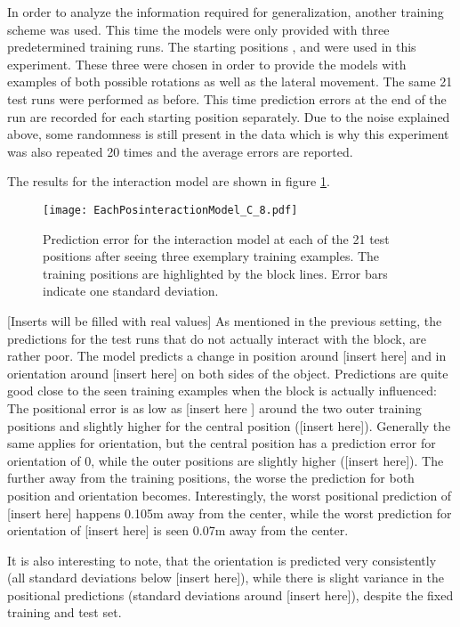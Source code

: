 In order to analyze the information required for generalization, another training scheme was used. This time the models were only provided with three predetermined training runs. The starting positions ,  and  were used in this experiment. These three were chosen in order to provide the models with examples of both possible rotations as well as the lateral movement. The same 21 test runs were performed as before. This time prediction errors at the end of the run are recorded for each starting position separately. Due to the noise explained above, some randomness is still present in the data which is why this experiment was also repeated 20 times and the average errors are reported. 

The results for the interaction model are shown in figure \ref{fig:eachPosInteraction}.

\begin{figure}
\centering
\texttt{[image: EachPosinteractionModel\_C\_8.pdf]}
\caption{Prediction error for the interaction model at each of the 21 test positions after seeing three exemplary training examples. The training positions are highlighted by the block lines. Error bars indicate one standard deviation.}
\label{fig:eachPosInteraction}
\end{figure}

[Inserts will be filled with real values]
As mentioned in the previous setting, the predictions for the test runs that do not actually interact with the block, are rather poor. The model predicts a change in position around [insert here] and in orientation around [insert here] on both sides of the object. 
Predictions are quite good close to the seen training examples when the block is actually influenced: The positional error is as low as [insert here ] around the two outer training positions and slightly higher for the central position ([insert here]). Generally the same applies for orientation, but the central position has a prediction error for orientation of 0, while the outer positions are slightly higher ([insert here]).
The further away from the training positions, the worse the prediction for both position and orientation becomes. Interestingly, the worst positional prediction of [insert here] happens 0.105m away from the center, while the worst prediction for orientation of [insert here] is seen 0.07m away from the center.

It is also interesting to note, that the orientation is predicted very consistently (all standard deviations below [insert here]), while there is slight variance in the positional predictions (standard deviations around [insert here]), despite the fixed training and test set.

